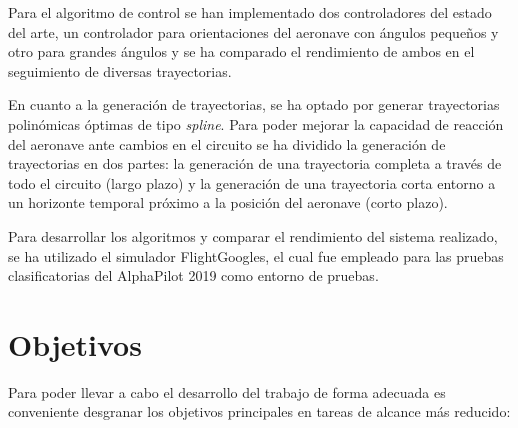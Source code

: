Para el algoritmo de control se han implementado dos controladores del estado del arte, un controlador para orientaciones del aeronave con ángulos pequeños y otro para grandes ángulos y se ha comparado el rendimiento de ambos en el seguimiento de diversas trayectorias.

En cuanto a la generación de trayectorias, se ha optado por generar trayectorias polinómicas óptimas de tipo \textit{spline}. Para poder mejorar la capacidad de reacción del aeronave ante cambios en el circuito se ha dividido la generación de trayectorias en dos partes: la generación de una trayectoria completa a través de todo el circuito (largo plazo) y la generación de una trayectoria corta entorno a un horizonte temporal próximo a la posición del aeronave (corto plazo).

Para desarrollar los algoritmos y comparar el rendimiento del sistema realizado, se ha utilizado el simulador FlightGoogles, el cual fue empleado para las pruebas clasificatorias del AlphaPilot 2019 como entorno de pruebas.



\section{Objetivos}


Para poder llevar a cabo el desarrollo del trabajo de forma adecuada es conveniente desgranar los objetivos principales en tareas de alcance más reducido:

